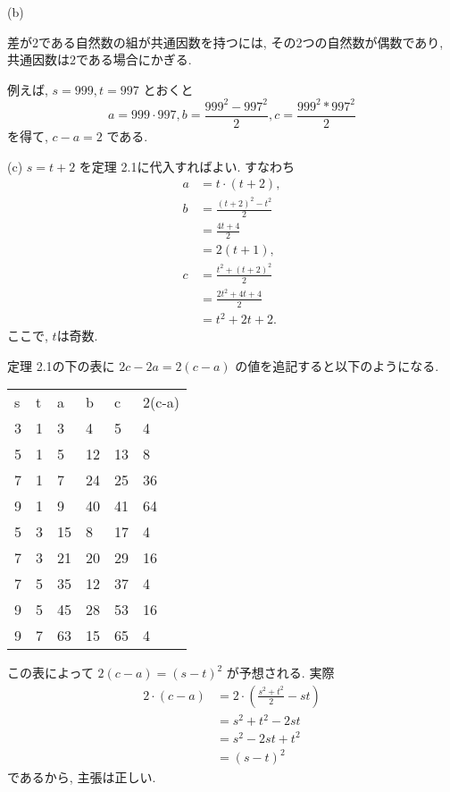\noindent (b) %

差が2である自然数の組が共通因数を持つには, その2つの自然数が偶数であり,
共通因数は2である場合にかぎる.

例えば, $s = 999, t = 997$ とおくと
\[
  a = 999 \cdot 997,
  b = \frac{999^2 - 997^2}{2},
  c = \frac{999^2 * 997^2}{2}
\]
を得て, $c - a = 2$ である.

\noindent (c) %
$s = t + 2$ を定理 2.1に代入すればよい.
すなわち
\begin{align*}
  a &= t \cdot (t+2), \\
  b
    &= \frac{(t+2)^2 - t^2}{2} \\
    &= \frac{4t+4}{2} \\
    &= 2(t+1), \\
c
  &= \frac{t^2 + (t + 2)^2}{2} \\
  &= \frac{2t^2 + 4t + 4}{2} \\
  &= t^2 + 2t + 2.
\end{align*}
ここで, $t$は奇数.


定理 2.1の下の表に $2c - 2a = 2(c-a)$ の値を追記すると以下のようになる.

\begin{tabular}{llllll}
s & t & a & b & c & 2(c-a) \\
3 & 1 & 3 & 4 & 5 & 4 \\
5 & 1 & 5 & 12 & 13 & 8 \\
7 & 1 & 7 & 24 & 25 & 36 \\
9 & 1 & 9 & 40 & 41 & 64 \\
5 & 3 & 15 & 8 & 17 & 4 \\
7 & 3 & 21 & 20 & 29 & 16 \\
7 & 5 & 35 & 12 & 37 & 4 \\
9 & 5 & 45 & 28 & 53 & 16 \\
9 & 7 & 63 & 15 & 65 & 4
\end{tabular}

この表によって $2(c-a) = (s-t)^2$ が予想される.
実際
\begin{align*}
2 \cdot (c-a)
  &= 2\cdot (\frac{s^2 + t^2}{2} - st) \\
  &= s^2 + t^2 - 2st \\
  &= s^2 - 2st + t^2 \\
  &= (s-t)^2
\end{align*}
であるから, 主張は正しい.
